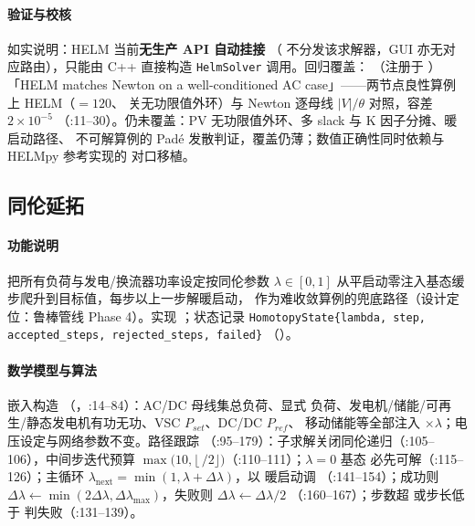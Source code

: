 \paragraph{验证与校核} 如实说明：HELM 当前\textbf{无生产 API 自动挂接}
（ 不分发该求解器，GUI 亦无对应路由），只能由
C++ 直接构造 \texttt{HelmSolver} 调用。回归覆盖：
（注册于 ）「HELM matches Newton on a
well-conditioned AC case」——两节点良性算例上 HELM（$=120$、
关无功限值外环）与 Newton 逐母线 $|V|/\theta$ 对照，容差 $2\times10^{-5}$
（:11--30）。仍未覆盖：PV 无功限值外环、多 slack 与 K 因子分摊、暖启动路径、
不可解算例的 Padé 发散判证，覆盖仍薄；数值正确性同时依赖与 HELMpy 参考实现的
对口移植。

\subsection{同伦延拓}\label{sec:robust:homotopy}

\paragraph{功能说明} 把所有负荷与发电/换流器功率设定按同伦参数
$\lambda\in[0,1]$ 从平启动零注入基态缓步爬升到目标值，每步以上一步解暖启动，
作为难收敛算例的兜底路径（设计定位：鲁棒管线 Phase 4）。实现
；状态记录
\texttt{HomotopyState\{lambda, step, accepted\_steps, rejected\_steps, failed\}}
（）。
\paragraph{数学模型与算法} 嵌入构造
（，:14--84）：AC/DC 母线集总负荷、显式
负荷、发电机/储能/可再生/静态发电机有功无功、VSC $P_{set}$、DC/DC $P_{ref}$、
移动储能等全部注入 $\times\lambda$；电压设定与网络参数不变。路径跟踪
（:95--179）：子求解关闭同伦递归（:105--106），中间步迭代预算
$\max(10,\lfloor\,$$/2\rfloor)$（:110--111）；$\lambda=0$ 基态
必先可解（:115--126）；主循环 $\lambda_{\mathrm{next}}=\min(1,\lambda+
\Delta\lambda)$，以  暖启动调 
（:141--154）；成功则 $\Delta\lambda\leftarrow\min(2\Delta\lambda,
\Delta\lambda_{\max})$，失败则 $\Delta\lambda\leftarrow\Delta\lambda/2$
（:160--167）；步数超  或步长低于
 判失败（:131--139）。
